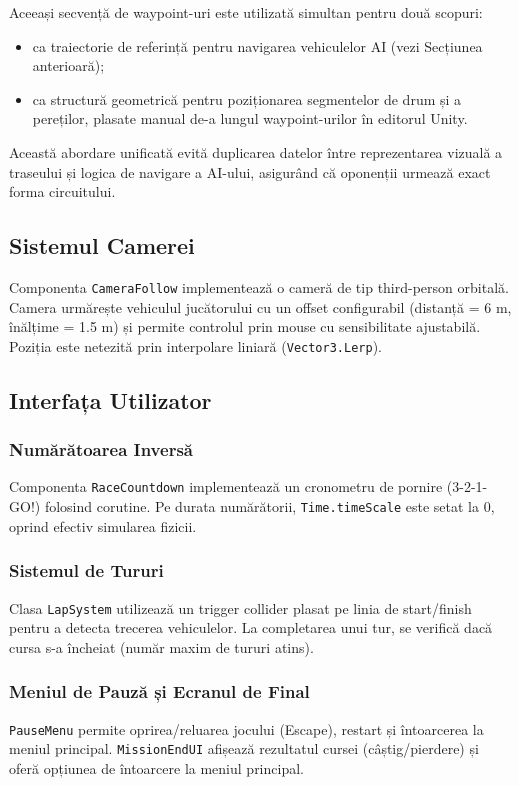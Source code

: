 Aceeași secvență de waypoint-uri este utilizată simultan pentru două scopuri:
\begin{itemize}
    \item ca traiectorie de referință pentru navigarea vehiculelor AI (vezi Secțiunea anterioară);
    \item ca structură geometrică pentru poziționarea segmentelor de drum și a pereților, plasate manual de-a lungul waypoint-urilor în editorul Unity.
\end{itemize}

Această abordare unificată evită duplicarea datelor între reprezentarea vizuală a traseului și logica de navigare a AI-ului, asigurând că oponenții urmează exact forma circuitului.

\subsection{Sistemul Camerei}

Componenta \texttt{CameraFollow} implementează o cameră de tip third-person orbitală. Camera urmărește vehiculul jucătorului cu un offset configurabil (distanță = 6 m, înălțime = 1.5 m) și permite controlul prin mouse cu sensibilitate ajustabilă. Poziția este netezită prin interpolare liniară (\texttt{Vector3.Lerp}).

\subsection{Interfața Utilizator}

\subsubsection{Numărătoarea Inversă}

Componenta \texttt{RaceCountdown} implementează un cronometru de pornire (3-2-1-GO!) folosind corutine. Pe durata numărătorii, \texttt{Time.timeScale} este setat la 0, oprind efectiv simularea fizicii.

\subsubsection{Sistemul de Tururi}

Clasa \texttt{LapSystem} utilizează un trigger collider plasat pe linia de start/finish pentru a detecta trecerea vehiculelor. La completarea unui tur, se verifică dacă cursa s-a încheiat (număr maxim de tururi atins).

\subsubsection{Meniul de Pauză și Ecranul de Final}

\texttt{PauseMenu} permite oprirea/reluarea jocului (Escape), restart și întoarcerea la meniul principal. \texttt{MissionEndUI} afișează rezultatul cursei (câștig/pierdere) și oferă opțiunea de întoarcere la meniul principal.

